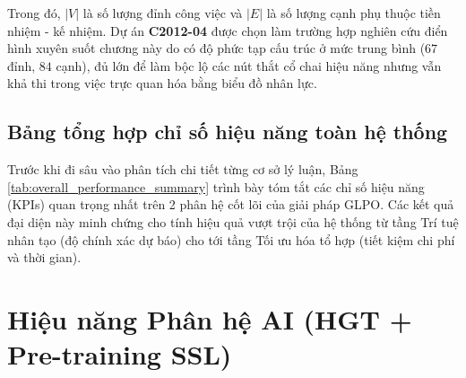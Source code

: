Trong đó, $|V|$ là số lượng đỉnh công việc và $|E|$ là số lượng cạnh phụ thuộc tiền nhiệm - kế nhiệm. Dự án \textbf{C2012-04} được chọn làm trường hợp nghiên cứu điển hình xuyên suốt chương này do có độ phức tạp cấu trúc ở mức trung bình ($67$ đỉnh, $84$ cạnh), đủ lớn để làm bộc lộ các nút thắt cổ chai hiệu năng nhưng vẫn khả thi trong việc trực quan hóa bằng biểu đồ nhân lực.

\subsection{Bảng tổng hợp chỉ số hiệu năng toàn hệ thống}
\label{sec:3.1.2_bang_tong_hop_chi_so}

Trước khi đi sâu vào phân tích chi tiết từng cơ sở lý luận, Bảng \ref{tab:overall_performance_summary} trình bày tóm tắt các chỉ số hiệu năng (KPIs) quan trọng nhất trên 2 phân hệ cốt lõi của giải pháp GLPO. Các kết quả đại diện này minh chứng cho tính hiệu quả vượt trội của hệ thống từ tầng Trí tuệ nhân tạo (độ chính xác dự báo) cho tới tầng Tối ưu hóa tổ hợp (tiết kiệm chi phí và thời gian).

\begin{table}[H]
\centering
\caption{Bảng tổng hợp chỉ số hiệu năng đại diện của toàn hệ thống GLPO}
\label{tab:overall_performance_summary}
\small
{}
\end{table}

\section{Hiệu năng Phân hệ AI (HGT + Pre-training SSL)}
\label{sec:3.3_hieu_nang_ai}

